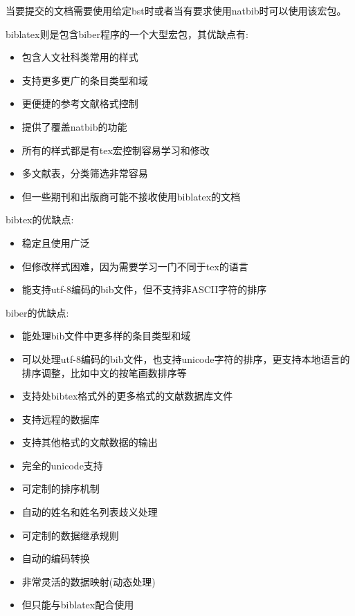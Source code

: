 当要提交的文档需要使用给定bst时或者当有要求使用natbib时可以使用该宏包。

biblatex则是包含biber程序的一个大型宏包，其优缺点有:
\begin{itemize}
  \item 包含人文社科类常用的样式

  \item 支持更多更广的条目类型和域

  \item 更便捷的参考文献格式控制

  \item 提供了覆盖natbib的功能

  \item 所有的样式都是有tex宏控制容易学习和修改

  \item 多文献表，分类筛选非常容易

  \item 但一些期刊和出版商可能不接收使用biblatex的文档
\end{itemize}

bibtex的优缺点:

\begin{itemize}
  \item 稳定且使用广泛

  \item 但修改样式困难，因为需要学习一门不同于tex的语言

  \item 能支持utf-8编码的bib文件，但不支持非ASCII字符的排序
\end{itemize}

biber的优缺点:
\begin{itemize}
  \item 能处理bib文件中更多样的条目类型和域

  \item 可以处理utf-8编码的bib文件，也支持unicode字符的排序，更支持本地语言的排序调整，比如中文的按笔画数排序等

  \item 支持处bibtex格式外的更多格式的文献数据库文件

  \item 支持远程的数据库

  \item 支持其他格式的文献数据的输出

  \item 完全的unicode支持

  \item 可定制的排序机制

  \item 自动的姓名和姓名列表歧义处理

  \item 可定制的数据继承规则

  \item 自动的编码转换

  \item 非常灵活的数据映射(动态处理)

  \item 但只能与biblatex配合使用
\end{itemize}




